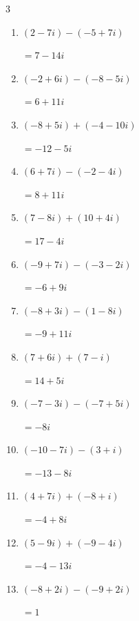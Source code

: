 \begin{multicols}{3}
\begin{enumerate}
        $\displaystyle =-11+7i$

\columnbreak %

  \item $\displaystyle (2-7i) - (-5+7i)$

        $\displaystyle =7-14i$

  \item $\displaystyle (-2+6i) - (-8-5i)$

        $\displaystyle =6+11i$

  \item $\displaystyle (-8+5i) + (-4-10i)$

        $\displaystyle =-12-5i$

  \item $\displaystyle (6+7i) - (-2-4i)$

        $\displaystyle =8+11i$

  \item $\displaystyle (7-8i) + (10+4i)$

        $\displaystyle =17-4i$

  \item $\displaystyle (-9+7i) - (-3-2i)$

        $\displaystyle =-6+9i$

  \item $\displaystyle (-8+3i) - (1-8i)$

        $\displaystyle =-9+11i$

  \item $\displaystyle (7+6i) + (7-i)$

        $\displaystyle =14+5i$

  \item $\displaystyle (-7-3i) - (-7+5i)$

        $\displaystyle =-8i$

  \item $\displaystyle (-10-7i) - (3+i)$

        $\displaystyle =-13-8i$

  \item $\displaystyle (4+7i) + (-8+i)$

        $\displaystyle =-4+8i$

  \item $\displaystyle (5-9i) + (-9-4i)$

        $\displaystyle =-4-13i$

  \item $\displaystyle (-8+2i) - (-9+2i)$

        $\displaystyle =1$


\end{enumerate}
\end{multicols}
